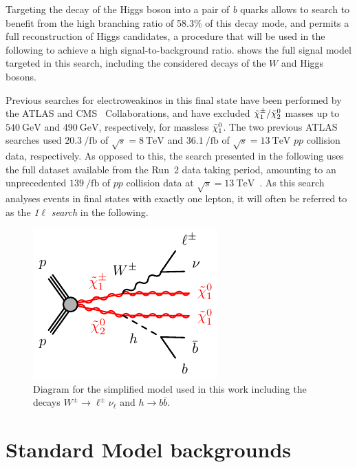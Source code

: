 Targeting the decay of the Higgs boson into a pair of \textit{b} quarks allows to search to benefit from the high branching ratio of 58.3\% of this decay mode, and permits a full reconstruction of Higgs candidates, a procedure that will be used in the following to achieve a high signal-to-background ratio.
 shows the full signal model targeted in this search, including the considered decays of the $W$ and Higgs bosons. 

Previous searches for electroweakinos in this final state have been performed by the \mbox{ATLAS} \cite{SUSY-2013-23,SUSY-2017-01} and CMS~\cite{CMS-SUS-16-043} Collaborations, and have excluded $\tilde{\chi}_1^\pm/\tilde{\chi}_2^0$ masses up to $\SI{540}{\GeV}$ and $\SI{490}{\GeV}$, respectively, for massless $\tilde{\chi}_1^0$.
The two previous ATLAS searches used $\SI{20.3}{\per\femto\barn}$ of $\sqrt{s}=\SI{8}{\TeV}$ and $\SI{36.1}{\per\femto\barn}$ of $\sqrt{s}=\SI{13}{\TeV}$ $pp$ collision data, respectively.
As opposed to this, the search presented in the following uses the full dataset available from the Run~2 data taking period, amounting to an unprecedented $\SI{139}{\per\femto\barn}$ of $pp$ collision data at $\sqrt{s}=\SI{13}{\TeV}$~\cite{SUSY-2019-08}.
As this search analyses events in final states with exactly one lepton, it will often be referred to as the \textit{1}$\ell$ \textit{search} in the following.

\begin{figure}
	\centering\includegraphics[width=.4\textwidth]{model_c1n2_Wh}
	\caption{Diagram for the simplified model used in this work including the decays $W^\pm\rightarrow\ell^\pm\nu_\ell$ and $h\rightarrow b\bar{b}$.}\label{fig:Wh_model_full}
\end{figure}

\section{Standard Model backgrounds}


